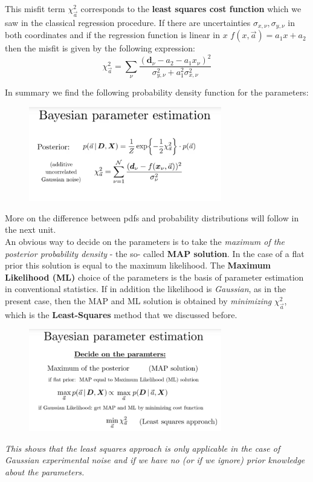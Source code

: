 \documentclass[12pt, a4paper]{scrartcl}
\begin{document}
This misfit term $\chi_{\vec{a}}^2$ corresponds to the \textbf{least squares cost function} which we
saw in the classical regression procedure. 
If there are uncertainties $\sigma_{x,\nu}, \sigma_{y,\nu}$ in both coordinates and if the regression
function is linear in $x$ $f(x,\vec{a})=a_1x+a_2$ then the misfit is given by the following expression:
\[\chi_{\vec{a}}^2=\sum_{\nu}\frac{(\boldsymbol{d}_{\nu}-a_2-a_1x_{\nu})^2}{\sigma_{y,\nu}^2+a_1^2\sigma_{x,\nu}^2}\]

In summary we find the following probability density function for the parameters:
\begin{figure}[H]
	\centering
	\includegraphics[width=0.75\textwidth]{7_4.png}
\end{figure}
More on the difference between pdfs and probability distributions will follow in the next unit.\\

An obvious way to decide on the parameters is to take the \textit{maximum of the posterior probability density} - the so-
called \textbf{MAP solution}. In the case of a flat prior this solution is
equal to the maximum likelihood. The\textbf{ Maximum Likelihood (ML)} choice of
the parameters is the basis of parameter estimation in conventional statistics.
If in addition the likelihood is \textit{Gaussian}, as in the present case, then the
MAP and ML solution is obtained by \textit{minimizing} $\chi_{\vec{a}}^2$, which is the
\textbf{Least-Squares} method that we discussed before.\\%
\begin{figure}[H]
	\centering
	\includegraphics[width=0.75\textwidth]{7_5.png}
\end{figure}
\textit{This shows that the least squares approach is \textit{only applicable} in the case of Gaussian 
experimental noise and if we have no (or if we ignore) prior knowledge about the parameters.} \\
\end{document}
